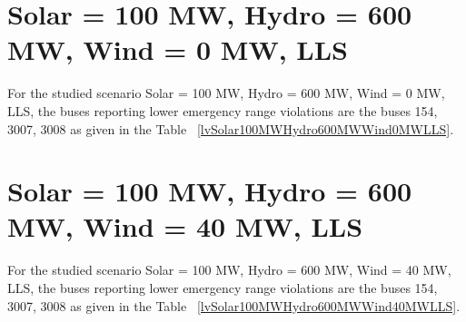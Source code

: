 \documentclass[10pt]{report}
\begin{document}
\section{Solar = 100 MW, Hydro = 600 MW, Wind = 0 MW, LLS}
For the studied scenario Solar = 100 MW, Hydro = 600 MW, Wind = 0 MW, LLS, the buses reporting lower emergency range violations are the buses 154, 3007, 3008 as given in the Table ~\ref{lvSolar100MWHydro600MWWind0MWLLS}.
\begin{table}[H]
\caption{Contingencies reporting bus voltages lower than emergency voltage of 1.1 PU for scenario Solar = 100 MW, Hydro = 600 MW, Wind = 0 MW, LLS}
\label{lvSolar100MWHydro600MWWind0MWLLS}
\centering
{}
\end{table}

\section{Solar = 100 MW, Hydro = 600 MW, Wind = 40 MW, LLS}
For the studied scenario Solar = 100 MW, Hydro = 600 MW, Wind = 40 MW, LLS, the buses reporting lower emergency range violations are the buses 154, 3007, 3008 as given in the Table ~\ref{lvSolar100MWHydro600MWWind40MWLLS}.
\begin{table}[H]
\caption{Contingencies reporting bus voltages lower than emergency voltage of 1.1 PU for scenario Solar = 100 MW, Hydro = 600 MW, Wind = 40 MW, LLS}
\label{lvSolar100MWHydro600MWWind40MWLLS}
\centering
{}
\end{table}
\end{document}
